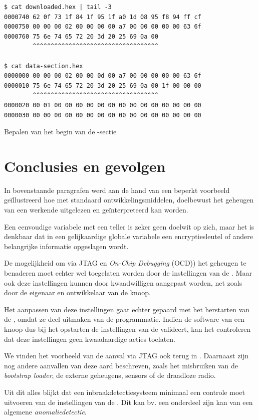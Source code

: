 \begin{listing}[ht]
  \begin{verbatim}
$ cat downloaded.hex | tail -3
0000740 62 0f 73 1f 84 1f 95 1f a0 1d 08 95 f8 94 ff cf
0000750 00 00 00 02 00 00 00 00 a7 00 00 00 00 00 63 6f
0000760 75 6e 74 65 72 20 3d 20 25 69 0a 00
        ^^^^^^^^^^^^^^^^^^^^^^^^^^^^^^^^^^^

$ cat data-section.hex
0000000 00 00 00 02 00 00 0d 00 a7 00 00 00 00 00 63 6f
0000010 75 6e 74 65 72 20 3d 20 25 69 0a 00 1f 00 00 00
        ^^^^^^^^^^^^^^^^^^^^^^^^^^^^^^^^^^^
0000020 00 01 00 00 00 00 00 00 00 00 00 00 00 00 00 00
0000030 00 00 00 00 00 00 00 00 00 00 00 00 00 00 00 00
  \end{verbatim}
  \vspace{-5mm}
  \caption{Bepalen van het begin van de -sectie}
  \label{lst:determine-bss}
\end{listing}

\section{Conclusies en gevolgen}

In bovenstaande paragrafen werd aan de hand van een beperkt voorbeeld
ge\"illustreerd hoe met standaard ontwikkelingsmiddelen, doelbewust het
geheugen van een werkende \mcu uitgelezen en ge\"interpreteerd kan worden.

Een eenvoudige variabele met een teller is zeker geen doelwit op zich, maar het
is denkbaar dat in een gelijkaardige globale variabele een encryptiesleutel of
andere belangrijke informatie opgeslagen wordt.

De mogelijkheid om via JTAG en \emph{On-Chip Debugging} (OCD)) het geheugen te
benaderen moet echter wel toegelaten worden door de instellingen van de \mcu.
Maar ook deze instellingen kunnen door kwaadwilligen aangepast worden, net
zoals door de eigenaar en ontwikkelaar van de knoop.

Het aanpassen van deze instellingen gaat echter gepaard met het herstarten van
de \mcu, omdat ze deel uitmaken van de programmatie. Indien de software van een
knoop dus bij het opstarten de instellingen van de \mcu valideert, kan het
controleren dat deze instellingen geen kwaadaardige acties toelaten.

We vinden het voorbeeld van de aanval via JTAG ook terug in
\citep{becher2006tampering}. Daarnaast zijn nog andere aanvallen van deze aard
beschreven, zoals het misbruiken van de \emph{bootstrap loader}, de externe
geheugens, sensors of de draadloze radio.

Uit dit alles blijkt dat een inbraakdetectiesysteem minimaal een controle moet
uitvoeren van de instellingen van de \mcu. Dit kan bv. een onderdeel zijn kan
van een algemene \emph{anomaliedetectie}.
